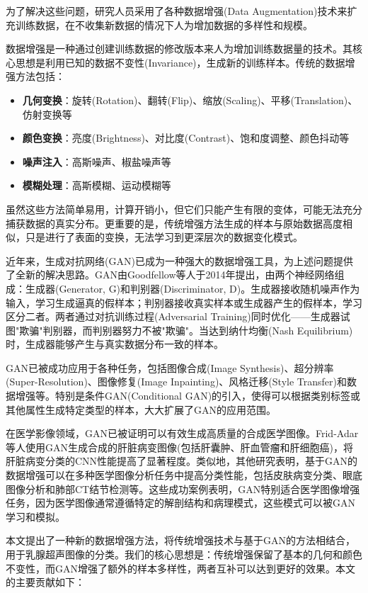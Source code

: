 \documentclass[supercite]{../Hust-undergraduate-translation/Experimental_Report}
\theoremstyle{definition}
\begin{document}
为了解决这些问题，研究人员采用了各种数据增强(Data Augmentation)技术来扩充训练数据，在不收集新数据的情况下人为增加数据的多样性和规模。

数据增强是一种通过创建训练数据的修改版本来人为增加训练数据量的技术。其核心思想是利用已知的数据不变性(Invariance)，生成新的训练样本。传统的数据增强方法包括：
\begin{itemize}
\item \textbf{几何变换}：旋转(Rotation)、翻转(Flip)、缩放(Scaling)、平移(Translation)、仿射变换等
\item \textbf{颜色变换}：亮度(Brightness)、对比度(Contrast)、饱和度调整、颜色抖动等
\item \textbf{噪声注入}：高斯噪声、椒盐噪声等
\item \textbf{模糊处理}：高斯模糊、运动模糊等
\end{itemize}

虽然这些方法简单易用，计算开销小，但它们只能产生有限的变体，可能无法充分捕获数据的真实分布。更重要的是，传统增强方法生成的样本与原始数据高度相似，只是进行了表面的变换，无法学习到更深层次的数据变化模式。

近年来，生成对抗网络(GAN)已成为一种强大的数据增强工具，为上述问题提供了全新的解决思路。GAN由Goodfellow等人于2014年提出，由两个神经网络组成：生成器(Generator, G)和判别器(Discriminator, D)。生成器接收随机噪声作为输入，学习生成逼真的假样本；判别器接收真实样本或生成器产生的假样本，学习区分二者。两者通过对抗训练过程(Adversarial Training)同时优化——生成器试图"欺骗"判别器，而判别器努力不被"欺骗"。当达到纳什均衡(Nash Equilibrium)时，生成器能够产生与真实数据分布一致的样本。

GAN已被成功应用于各种任务，包括图像合成(Image Synthesis)、超分辨率(Super-Resolution)、图像修复(Image Inpainting)、风格迁移(Style Transfer)和数据增强等。特别是条件GAN(Conditional GAN)的引入，使得可以根据类别标签或其他属性生成特定类型的样本，大大扩展了GAN的应用范围。

在医学影像领域，GAN已被证明可以有效生成高质量的合成医学图像。Frid-Adar等人使用GAN生成合成的肝脏病变图像(包括肝囊肿、肝血管瘤和肝细胞癌)，将肝脏病变分类的CNN性能提高了显著程度。类似地，其他研究表明，基于GAN的数据增强可以在多种医学图像分析任务中提高分类性能，包括皮肤病变分类、眼底图像分析和肺部CT结节检测等。这些成功案例表明，GAN特别适合医学图像增强任务，因为医学图像通常遵循特定的解剖结构和病理模式，这些模式可以被GAN学习和模拟。

本文提出了一种新的数据增强方法，将传统增强技术与基于GAN的方法相结合，用于乳腺超声图像的分类。我们的核心思想是：传统增强保留了基本的几何和颜色不变性，而GAN增强了额外的样本多样性，两者互补可以达到更好的效果。本文的主要贡献如下：
\end{document}
